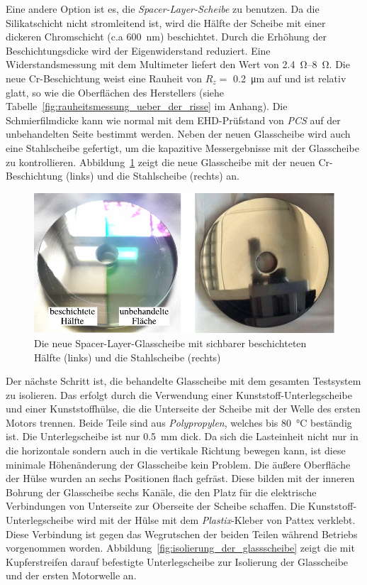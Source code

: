 Eine andere Option ist es, die \textit{Spacer-Layer-Scheibe} zu benutzen.
Da die Silikatschicht nicht stromleitend ist, wird die Hälfte der Scheibe mit einer dickeren Chromschicht (c.a \SI{600}{\nano\meter}) beschichtet.
Durch die Erhöhung der Beschichtungsdicke wird der Eigenwiderstand reduziert.
Eine Widerstandsmessung mit dem Multimeter liefert den Wert von \SIrange{2.4}{8}{\ohm}.
Die neue Cr-Beschichtung weist eine Rauheit von $R_z =$ \SI{0.2}{\um}  auf und ist relativ glatt, so wie die Oberflächen des Herstellers (siehe Tabelle~\ref{fig:rauheitsmessung_ueber_der_risse} im Anhang).
Die Schmierfilmdicke kann wie normal mit dem EHD-Prüfstand von \textit{PCS} auf der unbehandelten Seite bestimmt werden.
Neben der neuen Glasscheibe wird auch eine Stahlscheibe gefertigt, um die kapazitive Messergebnisse mit der Glasscheibe zu kontrollieren.
Abbildung~\ref{fig:scheiben} zeigt die neue Glasscheibe mit der neuen Cr-Beschichtung (links) und die Stahlscheibe (rechts) an.

\begin{figure}[htb]
    \centering
    \includegraphics[]{./images/scheiben.pdf}
    \caption{Die neue Spacer-Layer-Glasscheibe mit sichbarer beschichteten Hälfte (links) und die Stahlscheibe (rechts)}
    \label{fig:scheiben}
\end{figure}

Der nächste Schritt ist, die behandelte Glasscheibe mit dem gesamten Testsystem zu isolieren.
Das erfolgt durch die Verwendung einer Kunststoff-Unterlegscheibe und einer Kunststoffhülse, die die Unterseite der Scheibe mit der Welle des ersten Motors trennen.
Beide Teile sind aus \textit{Polypropylen}, welches bis \SI{80}{\degreeCelsius} beständig ist.
Die Unterlegscheibe ist nur \SI{0.5}{\milli\meter} dick.
Da sich die Lasteinheit nicht nur in die horizontale sondern auch in die vertikale Richtung bewegen kann, ist diese minimale Höhenänderung der Glasscheibe kein Problem.
Die äußere Oberfläche der Hülse wurden an sechs Positionen flach gefräst.
Diese bilden mit der inneren Bohrung der Glasscheibe sechs Kanäle, die den Platz für die elektrische Verbindungen von Unterseite zur Oberseite der Scheibe schaffen.
Die Kunststoff-Unterlegscheibe wird mit der Hülse mit dem \textit{Plastix}-Kleber von Pattex verklebt.
Diese Verbindung ist gegen das Wegrutschen der beiden Teilen während Betriebs vorgenommen worden.
Abbildung~\ref{fig:isolierung_der_glassscheibe} zeigt die mit Kupferstreifen darauf befestigte Unterlegscheibe zur Isolierung der Glasscheibe und der ersten Motorwelle an.

